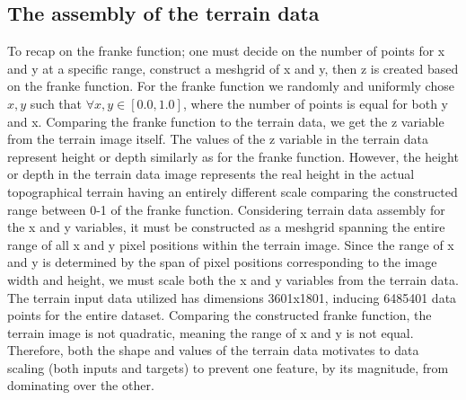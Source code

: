 \documentclass[11pt, a4paper]{article}
\begin{document}
\subsection*{The assembly of the terrain data}
To recap on the franke function; one must decide on the number of points for x and y at a specific range, construct a meshgrid of x and y, then z is created based on 
the franke function. For the franke function we randomly and uniformly chose $x,y$ such that $\forall x,y \in{[0.0,1.0]}$, where the number of points is equal for both
y and x. Comparing the franke function to the terrain data, we get the z variable from the terrain image itself. The values of the z variable in the terrain data represent 
height or depth similarly as for the franke function. However, the height or depth in the terrain data image represents the real height in the actual topographical terrain
having an entirely different scale comparing the constructed range between 0-1 of the franke function. Considering terrain data assembly for the x and y variables, 
it must be constructed as a meshgrid spanning the entire range of all x and y pixel positions within the terrain image. Since the range of x and y is determined by 
the span of pixel positions corresponding to the image width and height, we must scale both the x and y variables from the terrain data. The terrain input data utilized
has dimensions 3601x1801, inducing 6485401 data points for the entire dataset. Comparing the constructed franke function, the terrain image is not quadratic, meaning 
the range of x and y is not equal. Therefore, both the shape and values of the terrain data motivates to data scaling (both inputs and targets) to prevent one feature,
by its magnitude, from dominating over the other. 
\end{document}
